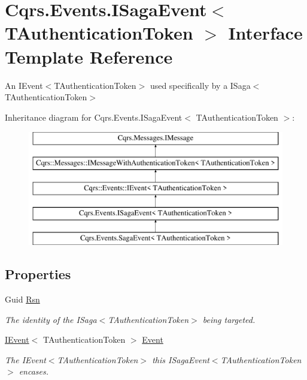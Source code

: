 \hypertarget{interfaceCqrs_1_1Events_1_1ISagaEvent}{}\section{Cqrs.\+Events.\+I\+Saga\+Event$<$ T\+Authentication\+Token $>$ Interface Template Reference}
\label{interfaceCqrs_1_1Events_1_1ISagaEvent}


An I\+Event$<$\+T\+Authentication\+Token$>$ used specifically by a I\+Saga$<$\+T\+Authentication\+Token$>$  


Inheritance diagram for Cqrs.\+Events.\+I\+Saga\+Event$<$ T\+Authentication\+Token $>$\+:\begin{figure}[H]
\begin{center}
\leavevmode
\includegraphics[height=5.000000cm]{interfaceCqrs_1_1Events_1_1ISagaEvent}
\end{center}
\end{figure}
\subsection*{Properties}
\begin{DoxyCompactItemize}
\item 
Guid \hyperlink{interfaceCqrs_1_1Events_1_1ISagaEvent_a691de8fa0a9ffccaaeb98021a6f7751b_a691de8fa0a9ffccaaeb98021a6f7751b}{Rsn}
\begin{DoxyCompactList}\small\item\em The identity of the I\+Saga$<$\+T\+Authentication\+Token$>$ being targeted. \end{DoxyCompactList}\item 
\hyperlink{interfaceCqrs_1_1Events_1_1IEvent}{I\+Event}$<$ T\+Authentication\+Token $>$ \hyperlink{interfaceCqrs_1_1Events_1_1ISagaEvent_adc0c41f6a64cadb56d758093c02ef266_adc0c41f6a64cadb56d758093c02ef266}{Event}
\begin{DoxyCompactList}\small\item\em The I\+Event$<$\+T\+Authentication\+Token$>$ this I\+Saga\+Event$<$\+T\+Authentication\+Token$>$ encases. \end{DoxyCompactList}\end{DoxyCompactItemize}


